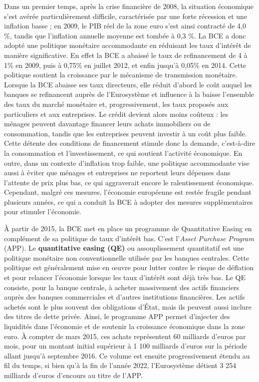 Dans un premier temps, après la crise financière de 2008, la situation économique s'est avérée particulièrement difficile, caractérisée par une forte récession et une inflation basse ; en 2009, le PIB réel de la zone euro s'est ainsi contracté de 4,0 \%, tandis que l'inflation annuelle moyenne est tombée à 0,3 \%. La BCE a donc adopté une politique monétaire accommodante en réduisant les taux d'intérêt de manière significative. En effet la BCE a abaissé le taux de refinancement de 4 à 1\% en 2009, puis à 0,75\% en juillet 2012, et enfin jusqu'à 0,05\% en 2014. Cette politique soutient la croissance par le mécanisme de transmission monétaire. Lorsque la BCE abaisse ses taux directeurs, elle réduit d'abord le coût auquel les banques se refinancent auprès de l'Eurosystème et influence à la baisse l'ensemble des taux du marché monétaire et, progressivement, les taux proposés aux particuliers et aux entreprises. Le crédit devient alors moins coûteux : les ménages peuvent davantage financer leurs achats immobiliers ou de consommation, tandis que les entreprises peuvent investir à un coût plus faible. Cette détente des conditions de financement stimule donc la demande, c'est-à-dire la consommation et l'investissement, ce qui soutient l'activité économique. En outre, dans un contexte d'inflation trop faible, une politique accommodante vise aussi à éviter que ménages et entreprises ne reportent leurs dépenses dans l'attente de prix plus bas, ce qui aggraverait encore le ralentissement économique. Cependant, malgré ces mesures, l'économie européenne est restée fragile pendant plusieurs années, ce qui a conduit la BCE à adopter des mesures supplémentaires pour stimuler l'économie.

À partir de 2015, la BCE met en place un programme de Quantitative Easing en complément de sa politique de taux d'intérêt bas. C'est l'\textit{Asset Purchase Program }(APP).
Le \textbf{quantitative easing (QE)} \cite{banque_de_france3} ou assouplissement quantitatif est une politique monétaire non conventionnelle utilisée par les banques centrales. Cette politique est généralement mise en œuvre pour lutter contre le risque de déflation et pour relancer l'économie lorsque les taux d'intérêt sont déjà très bas. Le QE consiste, pour la banque centrale, à acheter massivement des actifs financiers auprès des banques commerciales et d'autres institutions financières. Les actifs achetés sont le plus souvent des obligations d'État, mais ils peuvent aussi inclure des titres de dette privée.
Ainsi, le programme APP permet d'injecter des liquidités dans l'économie et de soutenir la croissance économique dans la zone euro. À compter de mars 2015, ces achats représentent 60 milliards d'euros par mois, pour un montant initial supérieur à 1 100 milliards d'euros sur la période allant jusqu'à septembre 2016. Ce volume est ensuite progressivement étendu au fil du temps, si bien qu'à la fin de l'année 2022, l'Eurosystème détient 3 254 milliards d'euros d'encours au titre de l'APP.

